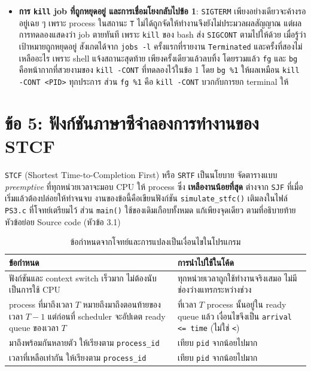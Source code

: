 \documentclass[a4paper,11pt]{article}
\newcommand{\code}[1]{\texttt{#1}}
\begin{document}
\begin{itemize}[leftmargin=*]
  \item \textbf{การ \code{kill} job ที่ถูกหยุดอยู่ และการเชื่อมโยงกลับไปข้อ 1}:
        \code{SIGTERM} เพียงอย่างเดียวจะค้างรออยู่เฉย ๆ เพราะ process ในสถานะ
        \code{T} ไม่ได้ถูกจัดให้ทำงานจึงยังไม่ประมวลผลสัญญาณ แต่ผลการทดลองแสดงว่า
        job ตายทันที เพราะ \code{kill} ของ bash ส่ง \code{SIGCONT} ตามไปให้ด้วย
        เมื่อรู้ว่าเป้าหมายถูกหยุดอยู่ สังเกตได้จาก \code{jobs -l} ครั้งแรกที่รายงาน
        \code{Terminated} และครั้งที่สองไม่เหลืออะไร เพราะ shell แจ้งสถานะสุดท้าย
        เพียงครั้งเดียวแล้วลบทิ้ง โดยรวมแล้ว \code{fg} และ \code{bg}
        คือหน้ากากที่สวยงามของ \code{kill -CONT} ที่ทดลองไว้ในข้อ 1
        โดย \code{bg \%1} ให้ผลเหมือน \code{kill -CONT <PID>} ทุกประการ
        ส่วน \code{fg \%1} คือ \code{kill -CONT} บวกกับการยก terminal ให้
\end{itemize}

\section{ข้อ 5: ฟังก์ชันภาษาซีจำลองการทำงานของ STCF}

\code{STCF} (Shortest Time-to-Completion First) หรือ \code{SRTF} เป็นนโยบาย
จัดตารางแบบ \emph{preemptive} ที่ทุกหน่วยเวลาจะมอบ CPU ให้ process ซึ่ง
\textbf{เหลืองานน้อยที่สุด} ต่างจาก \code{SJF} ที่เมื่อเริ่มแล้วต้องปล่อยให้ทำจนจบ
งานของข้อนี้คือเขียนฟังก์ชัน \code{simulate\_stfc()} เติมลงในไฟล์ \code{PS3.c}
ที่โจทย์เตรียมไว้ ส่วน \code{main()} ใช้ของเดิมเกือบทั้งหมด แก้เพียงจุดเดียว
ตามที่อธิบายท้ายหัวข้อย่อย Source code (หัวข้อ 3.1)

\begin{table}[H]
\centering\small
\caption{ข้อกำหนดจากโจทย์และการแปลงเป็นเงื่อนไขในโปรแกรม}
\begin{tabular}{p{6.6cm}p{7.4cm}}
\toprule
\textbf{ข้อกำหนด} & \textbf{การนำไปใช้ในโค้ด} \\
\midrule
ฟังก์ชันและ context switch เร็วมาก ไม่ต้องนับเป็นการใช้ CPU
  & ทุกหน่วยเวลาถูกใช้ทำงานจริงเสมอ ไม่มีช่องว่างแทรกระหว่างช่วง \\
process ที่มาถึงเวลา $T$ หมายถึงมาถึงตอนท้ายของเวลา $T-1$ แต่ก่อนที่ scheduler จะอัปเดต ready queue ของเวลา $T$
  & ที่เวลา $T$ process นั้นอยู่ใน ready queue แล้ว เงื่อนไขจึงเป็น \code{arrival <= time} (ไม่ใช่ \code{<}) \\
มาถึงพร้อมกันหลายตัว ให้เรียงตาม \code{process\_id}
  & เทียบ \code{pid} จากน้อยไปมาก \\
เวลาที่เหลือเท่ากัน ให้เรียงตาม \code{process\_id}
  & เทียบ \code{pid} จากน้อยไปมาก \\
\bottomrule
\end{tabular}
\end{table}
\end{document}
